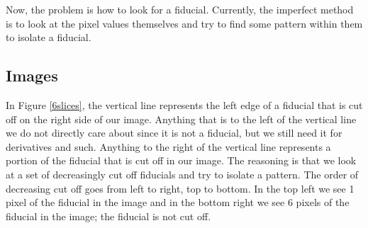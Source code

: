 \documentclass[10pt]{article}
\begin{document}
     Now, the problem is how to look for a fiducial. Currently, the imperfect method is to look at the pixel values themselves and try to find some pattern within them to isolate a fiducial. 


\subsection{Images} %
\label{sub:images}

In Figure \ref{6slices}, the vertical line represents the left edge of a fiducial that is cut off on the right side of our image. Anything that is to the left of the vertical line we do not directly care about since it is not a fiducial, but we still need it for derivatives and such. Anything to the right of the vertical line represents a portion of the fiducial that is cut off in our image. The reasoning is that we look at a set of decreasingly cut off fiducials and try to isolate a pattern. The order of decreasing cut off goes from left to right, top to bottom. In the top left we see 1 pixel of the fiducial in the image and in the bottom right we see 6 pixels of the fiducial in the image; the fiducial is not cut off. 
\end{document}
